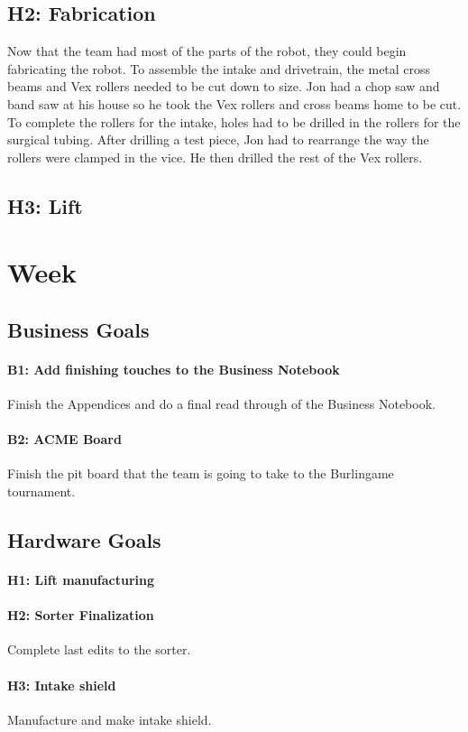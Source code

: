 \documentclass{article}
\begin{document}
{\subsection{H2: Fabrication}

Now that the team had most of the parts of the robot, they could begin fabricating the robot. To assemble the intake and drivetrain, the metal cross beams and Vex rollers needed to be cut down to size. Jon had a chop saw and band saw at his house so he took the Vex rollers and cross beams home to be cut. To complete the rollers for the intake, holes had to be drilled in the rollers for the surgical tubing. After drilling a test piece, Jon had to rearrange the way the rollers were clamped in the vice. He then drilled the rest of the Vex rollers.
\subsection{H3: Lift }
}\clearpage \newpage \section{Week \thesection} 
\subsection{Business Goals}
\paragraph{B1: Add finishing touches to the Business Notebook}
 Finish the Appendices and do a final read through of the Business Notebook.
\paragraph{B2: ACME Board}
 Finish the pit board that the team is going to take to the Burlingame tournament.
\subsection{Hardware Goals}
\paragraph{H1: Lift manufacturing}

\paragraph{H2: Sorter Finalization}
 Complete last edits to the sorter.
\paragraph{H3: Intake shield}
 Manufacture and make intake shield.
\end{document}
